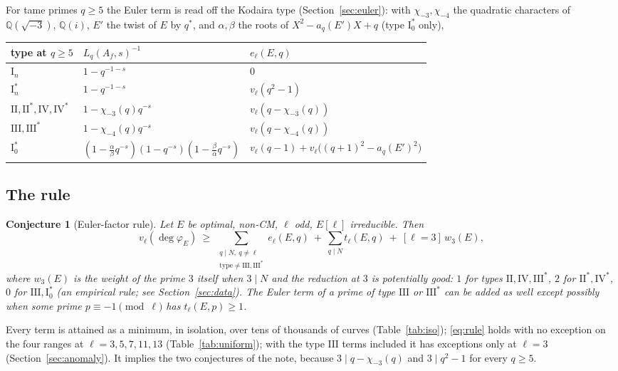 \documentclass[11pt]{amsart}
\newtheorem{conjecture}[theorem]{Conjecture}
\theoremstyle{definition}
\newcommand{\Q}{\mathbb{Q}}\newcommand{\Z}{\mathbb{Z}}\newcommand{\F}{\mathbb{F}}
\newcommand{\degphi}{\deg\varphi_E}\newcommand{\Gal}{\operatorname{Gal}}\newcommand{\ad}{\operatorname{ad}^0}
\begin{document}
For tame primes $q\ge5$ the Euler term is read off the Kodaira type (Section~\ref{sec:euler}): with $\chi_{-3},\chi_{-4}$ the quadratic characters of $\Q(\sqrt{-3})$, $\Q(i)$, $E'$ the twist of $E$ by $q^*$, and $\alpha,\beta$ the roots of $X^2-a_q(E')X+q$ (type $\mathrm{I}_0^*$ only),
\begin{center}\footnotesize
\begin{tabular}{lll}
\toprule
type at $q\ge5$ & $L_q(A_f,s)^{-1}$ & $e_\ell(E,q)$\\
\midrule
$\mathrm{I}_n$ & $1-q^{-1-s}$ & $0$\\
$\mathrm{I}_n^*$ & $1-q^{-1-s}$ & $v_\ell(q^2-1)$\\
$\mathrm{II},\mathrm{II}^*,\mathrm{IV},\mathrm{IV}^*$ & $1-\chi_{-3}(q)q^{-s}$ & $v_\ell(q-\chi_{-3}(q))$\\
$\mathrm{III},\mathrm{III}^*$ & $1-\chi_{-4}(q)q^{-s}$ & $v_\ell(q-\chi_{-4}(q))$\\
$\mathrm{I}_0^*$ & $(1-\tfrac{\alpha}{\beta}q^{-s})(1-q^{-s})(1-\tfrac{\beta}{\alpha}q^{-s})$ & $v_\ell(q-1)+v_\ell\bigl((q+1)^2-a_q(E')^2\bigr)$\\
\bottomrule
\end{tabular}
\end{center}

\subsection{The rule}
\begin{conjecture}[Euler-factor rule]\label{conj:euler}
Let $E$ be optimal, non-CM, $\ell$ odd, $E[\ell]$ irreducible. Then
\begin{equation}\label{eq:rule}
v_\ell(\degphi)\ \ge\ \sum_{\substack{q\mid N,\ q\ne\ell\\ \text{type}\ne\mathrm{III},\mathrm{III}^*}}e_\ell(E,q)\ +\ \sum_{q\mid N}t_\ell(E,q)\ +\ [\ell=3]\,w_3(E),
\end{equation}
where $w_3(E)$ is the weight of the prime $3$ itself when $3\mid N$ and the reduction at $3$ is potentially good: $1$ for types $\mathrm{II},\mathrm{IV},\mathrm{III}^*$, $2$ for $\mathrm{II}^*,\mathrm{IV}^*$, $0$ for $\mathrm{III},\mathrm{I}_0^*$ (an empirical rule; see Section~\ref{sec:data}). The Euler term of a prime of type $\mathrm{III}$ or $\mathrm{III}^*$ can be added as well except possibly when some prime $p\equiv-1\pmod\ell$ has $t_\ell(E,p)\ge1$.
\end{conjecture}

Every term is attained as a minimum, in isolation, over tens of thousands of curves (Table~\ref{tab:iso}); \eqref{eq:rule} holds with no exception on the four ranges at $\ell=3,5,7,11,13$ (Table~\ref{tab:uniform}); with the type $\mathrm{III}$ terms included it has exceptions only at $\ell=3$ (Section~\ref{sec:anomaly}). It implies the two conjectures of the note, because $3\mid q-\chi_{-3}(q)$ and $3\mid q^2-1$ for every $q\ge5$.
\end{document}
